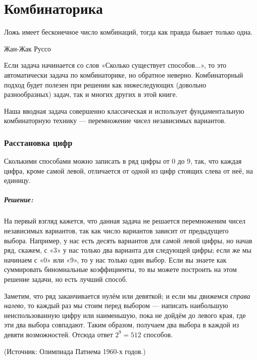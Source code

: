 \chapter*{Комбинаторика}

\setlength{\epigraphwidth}{.6\textwidth}
\epigraph{Ложь имеет бесконечное число комбинаций,
тогда как правда бывает только одна.}{Жан-Жак Руссо}

 
 
Если задача начинается со слов «Сколько существует способов...», то это автоматически задача по комбинаторике, но обратное неверно.
Комбинаторный подход будет полезен при решении как нижеследующих (довольно разнообразных) задач, так и многих других в этой книге.

Наша вводная задача совершенно классическая и использует фундаментальную
комбинаторную технику --- перемножение чисел независимых вариантов.

\subsection*{Расстановка цифр}%

Сколькими способами можно записать в ряд цифры от 0 до 9, так, что каждая цифра, кроме самой левой, отличается от одной из цифр стоящих слева от неё, на единицу.

\paragraph{Решение:} На первый взгляд кажется, что данная задача не решается перемноженим чисел независимых вариантов, так как число вариантов зависит от предыдущего выбора.
Например, у нас есть десять вариантов для самой левой цифры,
но начав ряд, скажем, с «3» у нас только два варианта для следующей цифры; если же мы начинаем с «0» или «9», то у нас только один выбор.
Если вы знаете как суммировать биномиальные коэффициенты, то вы можете построить на этом решение задачи, но есть лучший способ.

Заметим, что ряд заканчивается нулём или девяткой; и если мы движемся \emph{справа налево}, то каждый раз мы стоим перед выбором --- написать наибольшую неиспользованную цифру или наименьшую, пока не дойдём до левого края, где эти два выбора совпадают.
Таким образом, получаем два выбора в каждой из девяти возможностей.
Отсюда ответ $2^9=512$ способов.\heart

(Источник: Олимпиада Патнема 1960-х годов.)%

